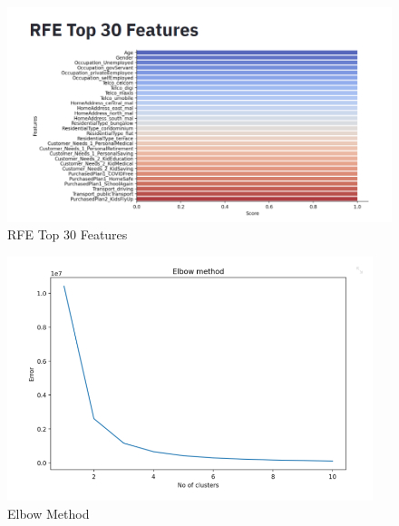 \documentclass[11pt]{article}
\begin{document}
 \begin{figure}[H] 
     \centering
     \includegraphics[width=1.25\textwidth]{diagram7.png}
     \caption{RFE Top 30 Features}
     \label{fig:diagram7.png}
 \end{figure}
 
  \begin{figure}[H] 
     \centering
     \includegraphics[width=0.95\textwidth]{diagram8.png}
     \caption{Elbow Method}
     \label{fig:diagram8.png}
 \end{figure}

\vspace{0.3cm}
\vspace{0.3cm}
\end{document}
